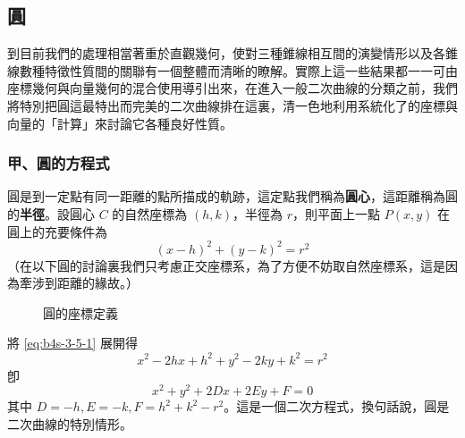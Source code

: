 \subsection{圓}
\label{sec:b4s-3-5}

到目前我們的處理相當著重於直觀幾何，使對三種錐線相互間的演變情形以及各錐線數種特徵性質間的關聯有一個整體而清晰的瞭解。實際上這一些結果都一一可由座標幾何與向量幾何的混合使用導引出來，在進入一般二次曲線的分類之前，我們將特別把圓這最特出而完美的二次曲線排在這裏，清一色地利用系統化了的座標與向量的「計算」來討論它各種良好性質。

\subsubsection*{甲、圓的方程式}

圓是到一定點有同一距離的點所描成的軌跡，這定點我們稱為\textbf{圓心}，這距離稱為圓的\textbf{半徑}。設圓心 $C$ 的自然座標為 $(h,k)$，半徑為 $r$，則平面上一點 $P(x,y)$ 在圓上的充要條件為
\begin{equation}
(x-h)^2 + (y-k)^2 = r^2 \label{eq:b4s-3-5-1}
\end{equation}
（在以下圓的討論裏我們只考慮正交座標系，為了方便不妨取自然座標系，這是因為牽涉到距離的緣故。）

\begin{figure}[htbp]
\centering
{}
\caption{圓的座標定義}
\label{fig:b4s-3-32}
\end{figure}

將 \eqref{eq:b4s-3-5-1} 展開得
\[ x^2 - 2hx + h^2 + y^2 - 2ky + k^2 = r^2 \]
卽
\begin{equation}
x^2 + y^2 + 2Dx + 2Ey + F = 0 \label{eq:b4s-3-5-2}
\end{equation}
其中 $D = -h, E = -k, F = h^2 + k^2 - r^2$。這是一個二次方程式，換句話說，圓是二次曲線的特別情形。

